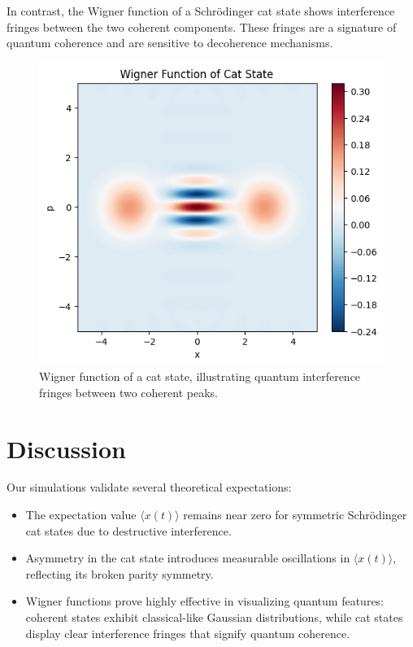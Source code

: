 \documentclass[conference]{IEEEtran}
\begin{document}
In contrast, the Wigner function of a Schr\"odinger cat state shows interference fringes between the two coherent components. These fringes are a signature of quantum coherence and are sensitive to decoherence mechanisms.

\begin{figure}[H]
    \centering
    \includegraphics[width=0.9\linewidth]{5.png}
    \caption{Wigner function of a cat state, illustrating quantum interference fringes between two coherent peaks.}
    \label{fig:wigner_cat}
\end{figure}

\section{Discussion}
Our simulations validate several theoretical expectations:
\begin{itemize}
    \item The expectation value $\langle x(t) \rangle$ remains near zero for symmetric Schr\"odinger cat states due to destructive interference.
    \item Asymmetry in the cat state introduces measurable oscillations in $\langle x(t) \rangle$, reflecting its broken parity symmetry.
    \item Wigner functions prove highly effective in visualizing quantum features: coherent states exhibit classical-like Gaussian distributions, while cat states display clear interference fringes that signify quantum coherence.
\end{itemize}
\end{document}
